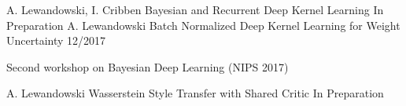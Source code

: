 \begin{cventries}
    \cventry
    {A. Lewandowski, I. Cribben}
    {Bayesian and Recurrent Deep Kernel Learning}
    {In Preparation}
    {
    }
  \cventry
    {A. Lewandowski}
    {Batch Normalized Deep Kernel Learning for Weight
Uncertainty}
    {12/2017}
    {
      \begin{cvitems}
    	\item Second workshop on Bayesian Deep Learning (NIPS 2017)
      \end{cvitems}
    }
  \cventry
    {A. Lewandowski}
    {Wasserstein Style Transfer with Shared Critic}
    {In Preparation}
    {
    }
  \end{cventries}

% 
% 
